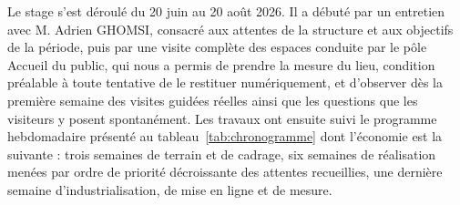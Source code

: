 Le stage s'est déroulé du 20 juin au 20 août 2026. Il a débuté par un entretien
avec M. Adrien GHOMSI, consacré aux attentes de la structure et aux objectifs de
la période, puis par une visite complète des espaces conduite par le pôle
Accueil du public, qui nous a permis de prendre la mesure du lieu, condition
préalable à toute tentative de le restituer numériquement, et d'observer dès la
première semaine des visites guidées réelles ainsi que les questions que les
visiteurs y posent spontanément. Les travaux ont ensuite suivi le programme
hebdomadaire présenté au tableau~\ref{tab:chronogramme}
dont l'économie est la suivante : trois semaines de terrain et de cadrage, six
semaines de réalisation menées par ordre de priorité décroissante des attentes
recueillies, une dernière semaine d'industrialisation, de mise en ligne et de
mesure.

